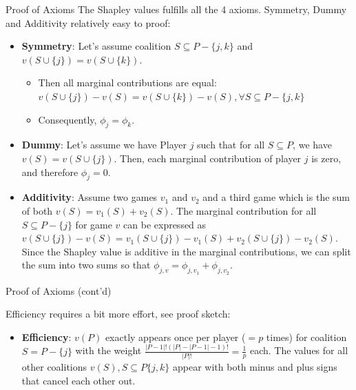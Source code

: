 \documentclass[aspectratio=169]{../latex_main/tntbeamer}  %
\begin{document}
\begin{frame}{Proof of Axioms}
  The Shapley values fulfills all the 4 axioms.
  Symmetry, Dummy and Additivity relatively easy to proof:
\begin{itemize}
  \item \textbf{Symmetry}: Let's assume coalition $S \subseteq P - \{j,k\}$ and $v(S \cup \{j\}) = v(S \cup \{k\})$. 
    \begin{itemize}
        \item Then all marginal contributions are equal: $v(S \cup \{j\}) -  v(S) = v(S \cup \{k\}) -  v(S), \forall S \subseteq P - \{j,k\}$
        \item Consequently, $\phi_j = \phi_k$.
    \end{itemize}
  \item \textbf{Dummy}: Let's assume we have Player $j$ such that for all $S \subseteq P$, we have $v(S) = v(S \cup \{j\})$. Then, each marginal contribution of player $j$ is zero, and therefore $\phi_j = 0$.
  \item \textbf{Additivity}:  Assume two games $v_1$ and $v_2$ and a third game which is the sum of both $v(S) = v_1(S) + v_2(S)$. The marginal contribution for all $S \subseteq P - \{j\}$ for game $v$ can be expressed as $v(S \cup \{j\}) - v(S) = v_1(S \cup \{j\}) - v_1(S) + v_2(S \cup \{j\}) - v_2(S)$. Since the Shapley value is additive in the marginal contributions, we can split the sum into two sums so that $\phi_{j,v} = \phi_{j, v_1} + \phi_{j,v_2}$.
\end{itemize}
\end{frame}

\begin{frame}{Proof of Axioms (cont'd)}
    
Efficiency requires a bit more effort, see proof sketch:
  \begin{itemize}
  \item \textbf{Efficiency}: $v(P)$ exactly appears once per player ($=p$ times) for coalition $S = P - \{j\}$ with the weight $\frac{|P - 1|!(|P| - |P - 1| - 1)!}{|P|!} = \frac{1}{p}$ each. The values for all other coalitions $v(S), S \subseteq P \{j,k\}$ appear with both minus and plus signs that cancel each other out.
\end{itemize}
\end{frame}
\end{document}
